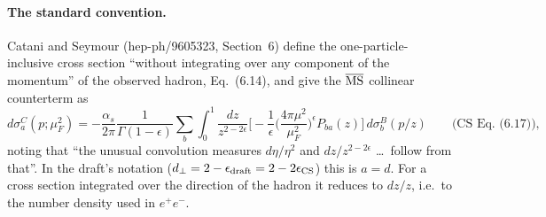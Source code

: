 \paragraph{The standard convention.} Catani and Seymour (hep-ph/9605323, Section~6) define the one-particle-inclusive cross section ``without integrating over any component of the momentum'' of the observed hadron, Eq.~(6.14), and give the $\overline{\rm MS}$ collinear counterterm as
\[
d\sigma^C_{a}(p;\mu_F^2)=-\frac{\alpha_s}{2\pi}\frac{1}{\Gamma(1-\epsilon)}\sum_b\int_0^1\frac{dz}{z^{2-2\epsilon}}\Big[-\frac1\epsilon\Big(\frac{4\pi\mu^2}{\mu_F^2}\Big)^\epsilon P_{ba}(z)\Big]\,d\sigma^B_b(p/z)\qquad\text{(CS Eq.~(6.17))},
\]
noting that ``the unusual convolution measures $d\eta/\eta^2$ and $dz/z^{2-2\epsilon}$ \ldots\ follow from that''. In the draft's notation ($d_\perp=2-\epsilon_{\rm draft}=2-2\epsilon_{\rm CS}$) this is $a=d$. For a cross section integrated over the direction of the hadron it reduces to $dz/z$, i.e.\ to the number density used in $e^+e^-$.

